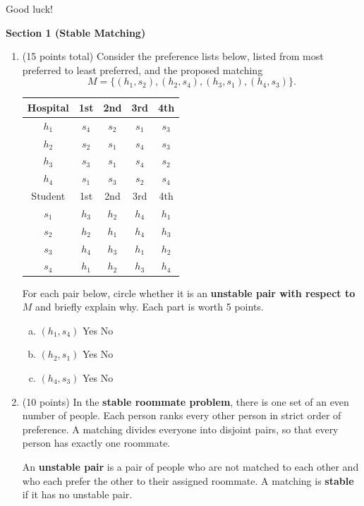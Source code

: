 \documentclass[11pt]{article}
\newcommand{\sectiontitle}[1]{\begin{center}\LARGE\textbf{#1}\end{center}}
\begin{document}
Good luck!
\newpage
\sectiontitle{Section 1 (Stable Matching)}
\begin{enumerate}
\item (15 points total) Consider the preference lists below, listed from most preferred to least preferred, and the proposed matching
\[
M=\{(h_1,s_2),(h_2,s_4),(h_3,s_1),(h_4,s_3)\}.
\]
\begin{center}
\begin{tabular}{c|cccc}
Hospital & 1st & 2nd & 3rd & 4th\\\hline
$h_1$ & $s_4$ & $s_2$ & $s_1$ & $s_3$\\
$h_2$ & $s_2$ & $s_1$ & $s_4$ & $s_3$\\
$h_3$ & $s_3$ & $s_1$ & $s_4$ & $s_2$\\
$h_4$ & $s_1$ & $s_3$ & $s_2$ & $s_4$\\\hline
Student & 1st & 2nd & 3rd & 4th\\\hline
$s_1$ & $h_3$ & $h_2$ & $h_4$ & $h_1$\\
$s_2$ & $h_2$ & $h_1$ & $h_4$ & $h_3$\\
$s_3$ & $h_4$ & $h_3$ & $h_1$ & $h_2$\\
$s_4$ & $h_1$ & $h_2$ & $h_3$ & $h_4$\\
\end{tabular}
\end{center}
For each pair below, circle whether it is an \textbf{unstable pair with respect to $M$} and briefly explain why. Each part is worth 5 points.
\begin{enumerate}[(a)]
\item $(h_1,s_4)$ \hfill Yes \qquad No
\vspace{1.05in}
\item $(h_2,s_1)$ \hfill Yes \qquad No
\vspace{1.05in}
\item $(h_4,s_3)$ \hfill Yes \qquad No
\vspace{.8in}
\end{enumerate}
\newpage
\item (10 points) In the \textbf{stable roommate problem}, there is one set of an even number of people. Each person ranks every other person in strict order of preference. A matching divides everyone into disjoint pairs, so that every person has exactly one roommate.

An \textbf{unstable pair} is a pair of people who are not matched to each other and who each prefer the other to their assigned roommate. A matching is \textbf{stable} if it has no unstable pair.


\end{enumerate}
\end{document}

